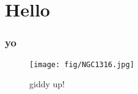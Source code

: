 \chapter{Hello}\label{intro}


\subsection{yo}

\begin{figure}[h]
\centering
\texttt{[image: fig/NGC1316.jpg]}
\label{tst}
\caption{giddy up!}
\end{figure}
